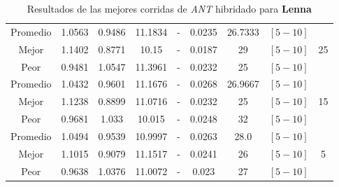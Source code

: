 \begin{table}[h!]
\begin{center}
\begin{tabular}{|c|c|c|c|c|c|c|c|c|}
        \hline
        \hline
            Promedio  & 1.0563 & 0.9486 & 11.1834 & - & 0.0235 & 26.7333 & $[5-10]$ & \\
            \cline{1-8}
            Mejor & 1.1402 & 0.8771  & 10.15 & - & 0.0187 & 29 & $[5-10]$ & 25\\
            \cline{1-8}
            Peor & 0.9481 & 1.0547  & 11.3961 & - & 0.0232 & 25 & $[5-10]$ & \\
        \hline
        \hline
            Promedio  & 1.0432 & 0.9601 & 11.1676 & - & 0.0268 & 26.9667 & $[5-10]$ & \\
            \cline{1-8}
            Mejor & 1.1238 & 0.8899  & 11.0716 & - & 0.0232 & 25 & $[5-10]$ & 15\\
            \cline{1-8}
            Peor & 0.9681 & 1.033  & 10.015 & - & 0.0248 & 32 & $[5-10]$ & \\
        \hline
        \hline
            Promedio  & 1.0494 & 0.9539 & 10.9997 & - & 0.0263 & 28.0 & $[5-10]$ & \\
            \cline{1-8}
            Mejor & 1.1015 & 0.9079  & 11.1517 & - & 0.0241 & 26 & $[5-10]$ & 5\\
            \cline{1-8}
            Peor & 0.9638 & 1.0376  & 11.0072 & - & 0.023 & 27 & $[5-10]$ & \\
        \hline
        \end{tabular}
        \caption{Resultados de las mejores corridas de \emph{ANT} hibridado para {\bf Lenna}}
        \label{tb:tableanthibimg}
    \end{center}
\end{table}
